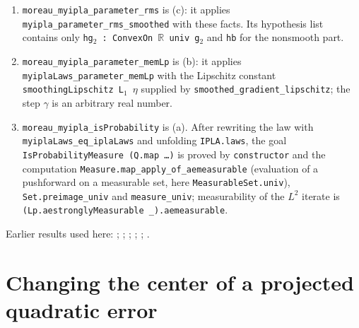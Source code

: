 \documentclass[11pt,a4paper]{report}
\begin{document}
\begin{leanbox}
\begin{enumerate}


\item \texttt{moreau\_\allowbreak{}myipla\_\allowbreak{}parameter\_\allowbreak{}rms} is (c): it applies \texttt{myipla\_\allowbreak{}parameter\_\allowbreak{}rms\_\allowbreak{}smoothed} with these facts. Its hypothesis list contains only \texttt{hg\ensuremath{{}_{2}} : Convex\allowbreak{}On \ensuremath{\mathbb R} univ g\ensuremath{{}_{2}}} and \texttt{hb} for the nonsmooth part.

\item \texttt{moreau\_\allowbreak{}myipla\_\allowbreak{}parameter\_\allowbreak{}mem\allowbreak{}Lp} is (b): it applies \texttt{myipla\allowbreak{}Laws\_\allowbreak{}parameter\_\allowbreak{}mem\allowbreak{}Lp} with the Lipschitz constant \texttt{smoothing\allowbreak{}Lipschitz L\ensuremath{{}_{1}} \ensuremath{\eta}} supplied by \texttt{smoothed\_\allowbreak{}gradient\_\allowbreak{}lipschitz}; the step \texttt{\ensuremath{\gamma}} is an arbitrary real number.

\item \texttt{moreau\_\allowbreak{}myipla\_\allowbreak{}is\allowbreak{}Probability} is (a). After rewriting the law with \texttt{myipla\allowbreak{}Laws\_\allowbreak{}eq\_\allowbreak{}ipla\allowbreak{}Laws} and unfolding \texttt{IPLA.\allowbreak{}laws}, the goal \texttt{Is\allowbreak{}Probability\allowbreak{}Measure (Q.\allowbreak{}map …)} is proved by \texttt{constructor} and the computation \texttt{Measure.\allowbreak{}map\_\allowbreak{}apply\_\allowbreak{}of\_\allowbreak{}aemeasurable} (evaluation of a pushforward on a measurable set, here \texttt{Measurable\allowbreak{}Set.\allowbreak{}univ}), \texttt{Set.\allowbreak{}preimage\_\allowbreak{}univ} and \texttt{measure\_\allowbreak{}univ}; measurability of the \(L^2\) iterate is \texttt{(Lp.\allowbreak{}aestrongly\allowbreak{}Measurable \_\allowbreak{}).\allowbreak{}aemeasurable}.

\end{enumerate}
\end{leanbox}


Earlier results used here: \cite[Section~3.17.4]{LangevinLean2026ULASC}; \cite[Section~3.1.1]{LangevinLean2026IPLA}; \cite[Section~3.1.6]{LangevinLean2026IPLA}; \cite[Section~3.3.1]{LangevinLean2026IPLA}; \cite[Section~3.3.2]{LangevinLean2026IPLA}; \cite[Section~3.3.3]{LangevinLean2026IPLA}.
\section{\texorpdfstring{Changing the center of a projected quadratic error}{Changing the center of a projected quadratic error}}
\label{proof-module-ProximalLangevin-ProjectionCenter-lean}
\end{document}
